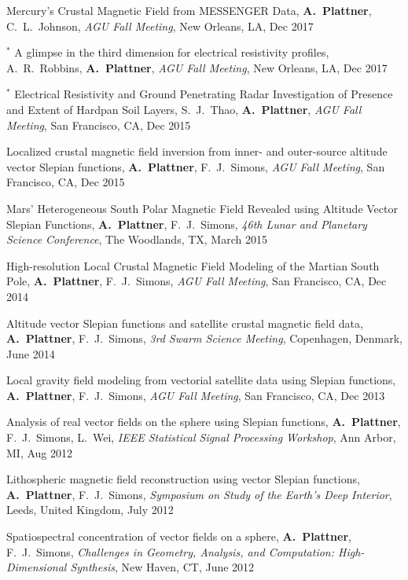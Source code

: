 \documentclass[10pt]{article}
\begin{document}
\spcp
Mercury's Crustal Magnetic Field from MESSENGER Data,
 \textbf{A.~Plattner}, C.~L.~Johnson, 
\emph{AGU Fall Meeting}, New Orleans, LA, Dec 2017 

\spcp
\hspace{-0.4cm} $^*$ A glimpse in the third dimension for electrical
resistivity profiles,
A.~R.~Robbins, \textbf{A.~Plattner},
\emph{AGU Fall Meeting}, New Orleans, LA, Dec 2017 

\spcp
\hspace{-0.4cm} $^*$ Electrical Resistivity and Ground Penetrating Radar 
Investigation of Presence and Extent of Hardpan Soil Layers,
 S.~J.~Thao, \textbf{A.~Plattner},
\emph{AGU Fall Meeting}, San Francisco, CA, Dec 2015

\spcp
Localized crustal magnetic field inversion from inner- and outer-source altitude vector Slepian functions, \textbf{A.~Plattner},  F.~J.~Simons,
\emph{AGU Fall Meeting}, San Francisco, CA, Dec 2015


\spcp
Mars' Heterogeneous South Polar Magnetic Field Revealed using Altitude Vector Slepian Functions,
\textbf{A.~Plattner},  F.~J.~Simons,
\emph{46th Lunar and Planetary Science Conference}, The Woodlands, TX, March 2015


\spcp
High-resolution Local Crustal Magnetic Field Modeling of the Martian South Pole,
\textbf{A.~Plattner},  F.~J.~Simons,
\emph{AGU Fall Meeting}, San Francisco, CA, Dec 2014

\spcp
Altitude vector Slepian functions and satellite crustal magnetic field data,
\textbf{A.~Plattner},  F.~J.~Simons,
\emph{3rd Swarm Science Meeting}, Copenhagen, Denmark, June 2014

\spcp
Local gravity field modeling from vectorial satellite data using Slepian functions,
\textbf{A.~Plattner},  F.~J.~Simons,
\emph{AGU Fall Meeting}, San Francisco, CA, Dec 2013

\spcp
Analysis of real vector fields on the sphere using Slepian functions,
\textbf{A.~Plattner}, F.~J.~Simons, L.~Wei,
\emph{IEEE Statistical Signal Processing Workshop}, Ann Arbor, MI, Aug 2012

\spcp
Lithospheric magnetic field reconstruction using vector Slepian functions,
\textbf{A.~Plattner}, F.~J.~Simons,
\emph{Symposium on Study of the Earth's Deep Interior}, Leeds, United Kingdom, July 2012

\spcp
Spatiospectral concentration of vector fields on a sphere,
\textbf{A.~Plattner}, F.~J.~Simons,
\emph{Challenges in Geometry, Analysis, and Computation: High-Dimensional Synthesis}, 
New Haven, CT, June 2012
\end{document}
